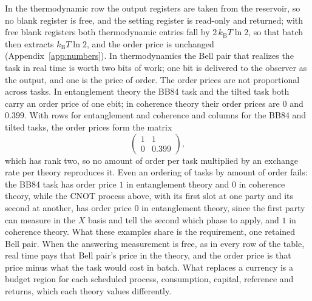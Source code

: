 \documentclass[11pt]{article}
\theoremstyle{definition}
\theoremstyle{remark}
\newcommand{\kB}{k_{\mathrm B}}
\begin{document}
In the thermodynamic row the output registers are taken from the reservoir, so no blank register is free, and the setting register is read-only and returned; with free blank registers both thermodynamic entries fall by $2\,\kB T\ln2$, so that batch then extracts $\kB T\ln2$, and the order price is unchanged (Appendix~\ref{app:numbers}). In thermodynamics the Bell pair that realizes the task in real time is worth two bits of work; one bit is delivered to the observer as the output, and one is the price of order. The order prices are not proportional across tasks. In entanglement theory the BB84 task and the tilted task both carry an order price of one ebit; in coherence theory their order prices are $0$ and $0.399$. With rows for entanglement and coherence and columns for the BB84 and tilted tasks, the order prices form the matrix
\[
\begin{pmatrix}1&1\\0&0.399\end{pmatrix},
\]
which has rank two, so no amount of order per task multiplied by an exchange rate per theory reproduces it. Even an ordering of tasks by amount of order fails: the BB84 task has order price $1$ in entanglement theory and $0$ in coherence theory, while the CNOT process above, with its first slot at one party and its second at another, has order price $0$ in entanglement theory, since the first party can measure in the $X$ basis and tell the second which phase to apply, and $1$ in coherence theory. What these examples share is the requirement, one retained Bell pair. When the answering measurement is free, as in every row of the table, real time pays that Bell pair's price in the theory, and the order price is that price minus what the task would cost in batch. What replaces a currency is a budget region for each scheduled process, consumption, capital, reference and returns, which each theory values differently.
\end{document}

